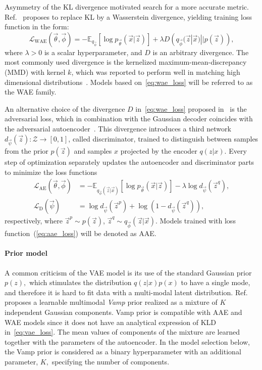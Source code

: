Asymmetry of the KL divergence motivated search for a more accurate metric. Ref.~\cite{tolstikhin2017wasserstein} proposes to replace KL by a Wasserstein divergence, yielding training loss function in the form:
\begin{equation}
    \mathcal{L}_{\text{WAE}} (\vec{\theta}, \vec{\phi}) = - \mathbb{E}_{q_{\vec{\phi}}} \left[ \log p_{\vec{\theta}}(\vec{x}|\vec{z}) \right] + \lambda D \left( q_{\vec{\phi}}(\vec{z}|\vec{x}) || p(\vec{z}) \right),
\label{eq:wae_loss}
\end{equation}
where $\lambda >0$  is a scalar hyperparameter, and $D$  is an arbitrary divergence. The most commonly used divergence is the kernelized maximum-mean-discrepancy (MMD) with kernel  $k$, which was reported to perform well in matching high dimensional distributions~\cite{zhao2017infovae}. Models based on~\eqref{eq:wae_loss} will be referred to as the WAE  family.

An alternative choice of the divergence $D$ in~\eqref{eq:wae_loss} proposed in~\cite{tolstikhin2017wasserstein} is the adversarial loss, which in combination with the Gaussian decoder coincides with the adversarial autoencoder~\cite{makhzani2015adversarial}. This divergence introduces a third network $d_{\vec{\psi}}(\vec{z}):\mathcal{Z} \rightarrow \left[ 0,1 \right]$,  called discriminator, trained to distinguish between samples from the prior $p(\vec{z})$ and samples $x$ projected by the encoder $q(z|x)$. Every step of optimization separately updates the autoencoder and discriminator parts to minimize the loss functions
\begin{align}
\label{eq:aae_loss}
\mathcal{L}_{\text{AE}}(\vec{\theta}, \vec{\phi}) & = - \mathbb{E}_{q_{\vec{\phi}}(\vec{z}|\vec{x})} \left[ \log p_{\vec{\theta}}(\vec{x}|\vec{z}) \right] - \lambda \log d_{\vec{\psi}}(\vec{z}^q), \\
\mathcal{L}_{\text{D}}(\vec{\psi}) & = \log d_{\vec{\psi}}(\vec{z}^p) + \log \left(1-d_{\vec{\psi}}(\vec{z}^q)\right),
\end{align}
respectively, where $\vec{z}^p \sim p(\vec{z})$, $\vec{z}^q \sim q_{\vec{\phi}}(\vec{z}|\vec{x})$. Models trained with loss function~(\ref{eq:aae_loss}) will be denoted as AAE.

\paragraph{Prior model}
A common criticism of the VAE model is its use of the standard Gaussian prior $p(z),$ which stimulates the distribution $q(z|x)p(x)$ to have a single mode, and therefore it is hard to fit data with a multi-modal latent distribution. Ref.~\cite{tomczak2018vae} proposes a learnable multimodal \emph{Vamp} prior realized as a mixture of $K$ independent Gaussian components. Vamp prior is compatible with AAE and WAE models since it does not have an analytical expression of KLD in~\eqref{eq:vae_loss}. The mean values of components of the mixture are learned together with the parameters of the autoencoder. In the model selection below, the Vamp prior is considered as a binary hyperparameter with an additional parameter, $K,$ specifying the number of components.

